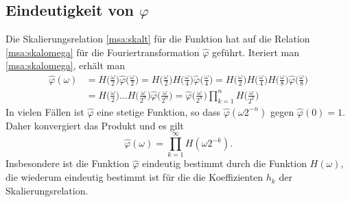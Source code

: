 \subsection{Eindeutigkeit von $\varphi$}
Die Skalierungsrelation \eqref{msa:skalt} für die Funktion hat auf
die Relation \eqref{msa:skalomega} für die Fouriertransformation
$\hat{\varphi}$ geführt.
Iteriert man \eqref{msa:skalomega}, erhält man
\begin{align*}
\hat{\varphi}(\omega)
&=
H\biggl(\frac{\omega}2\biggr)
\hat{\varphi}\biggl(\frac{\omega}2\biggr)
=
H\biggl(\frac{\omega}2\biggr)
H\biggl(\frac{\omega}4\biggr)
\hat{\varphi}\biggl(\frac{\omega}4\biggr)
=
H\biggl(\frac{\omega}2\biggr)
H\biggl(\frac{\omega}4\biggr)
H\biggl(\frac{\omega}8\biggr)
\hat{\varphi}\biggl(\frac{\omega}8\biggr)
\\
&=
H\biggl(\frac{\omega}2\biggr)
\dots
H\biggl(\frac{\omega}{2^n}\biggr)
\hat{\varphi}\biggl(\frac{\omega}{2^n}\biggr)
=
\hat{\varphi}\biggl(\frac{\omega}{2^n}\biggr)
\prod_{k=1}^n 
H\biggl(\frac{\omega}{2^k}\biggr)
\end{align*}
In vielen Fällen ist $\hat{\varphi}$ eine stetige Funktion, so dass
$\hat{\varphi}(\omega 2^{-n})$ gegen $\hat{\varphi}(0)=1$.
Daher konvergiert das Produkt und es gilt
\[
\hat{\varphi}(\omega) = \prod_{k=1}^\infty H(\omega 2^{-k}).
\]
Insbesondere ist die Funktion $\hat{\varphi}$ eindeutig bestimmt 
durch die Funktion $H(\omega)$, die wiederum eindeutig bestimmt ist
für die die Koeffizienten $h_k$ der Skalierungsrelation.


%
% 
%
